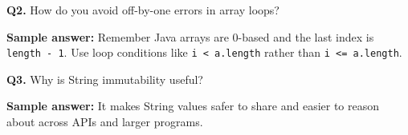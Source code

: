 \documentclass[11pt]{article}
\begin{document}
\vspace{0.6em}
\textbf{Q2.} How do you avoid off-by-one errors in array loops?\par
\textbf{Sample answer:} Remember Java arrays are 0-based and the last index is \texttt{length - 1}. Use loop conditions like \texttt{i < a.length} rather than \texttt{i <= a.length}.

\vspace{0.6em}
\textbf{Q3.} Why is String immutability useful?\par
\textbf{Sample answer:} It makes String values safer to share and easier to reason about across APIs and larger programs.
\end{document}
